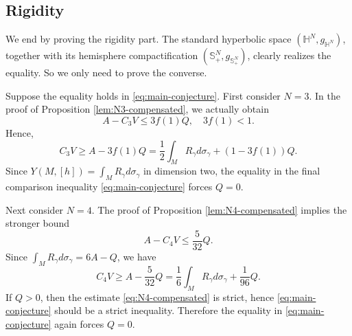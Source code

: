 \documentclass[11pt,letterpaper]{amsart}
\theoremstyle{definition}
\theoremstyle{remark}
\numberwithin{equation}{section}
\newcommand{\Sph}{\mathbb S}
\begin{document}
\subsection{Rigidity}
We end  by proving the rigidity part. The standard hyperbolic space $(\mathbb{H}^N, g_{\mathbb{H}^N})$, together with its hemisphere compactification $(\Sph_+^N, g_{\Sph_+^N})$, clearly realizes the equality. So we only need to prove the converse.

Suppose the equality holds in \eqref{eq:main-conjecture}.  First consider $N=3$.  
 In the proof of Proposition \ref{lem:N3-compensated}, we actually obtain
\[
A-C_3 V \leq 3 f(1) Q, \quad 3 f(1)<1.
\]
Hence,
\[
C_3 V \geq A-3 f(1) Q=\frac{1}{2} \int_M R_\gamma d \sigma_\gamma+(1-3 f(1)) Q.
\]
Since $Y(M,[h])=\int_M R_\gamma d \sigma_\gamma$ in dimension two, the equality in the final comparison inequality \eqref{eq:main-conjecture} forces $Q=0$.

Next consider $N=4$. The proof of Proposition \ref{lem:N4-compensated} implies the stronger bound
\[
A-C_4 V \leq \frac{5}{32} Q.
\]
Since $\int_M R_\gamma d \sigma_\gamma=6 A-Q$, we have
\[
C_4 V \geq A-\frac{5}{32} Q=\frac{1}{6} \int_M R_\gamma d \sigma_\gamma+\frac{1}{96} Q.
\]
If $Q>0$, then the estimate \eqref{eq:N4-compensated} is strict, hence  \eqref{eq:main-conjecture} should be a strict inequality. Therefore the equality in \eqref{eq:main-conjecture} again forces $Q=0$.
 
\end{document}
